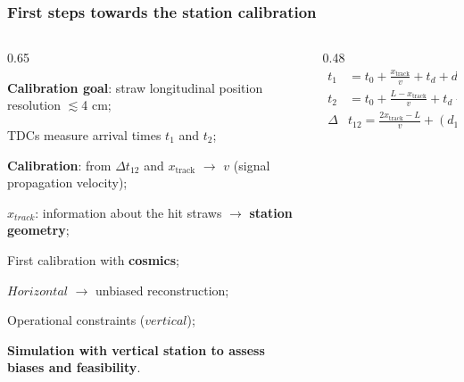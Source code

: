 \documentclass{beamer}
\begin{document}
\begin{frame}
    \frametitle{First steps towards the station calibration}
    
      \begin{columns}
        \begin{column}{0.65\framewidth}
                \setlength{\leftmargini}{1.2em}
                \vspace{-7mm}
            \begin{itemize}
             {\footnotesize 
             \item \textbf{Calibration goal}: straw longitudinal position resolution $\lesssim$4 cm;
           \vspace{3mm}
             \item TDCs measure arrival times $t_1$ and $t_2$;
  \vspace{3mm}
                \item \textbf{Calibration}: from $\Delta t_{12}$ and $x_{\text{track}}$ $\rightarrow$ $v$ (signal propagation velocity);
              \vspace{3mm}
                \item $x_{track}$: information about the hit straws $\rightarrow$ \textbf{station geometry};                          
              \vspace{3mm}
                \item First calibration with \textbf{cosmics};
                \vspace{3mm}
                \item $Horizontal$ $\rightarrow$ unbiased reconstruction; 
                               \vspace{3mm}
                \item Operational constraints ($vertical$);
                  \vspace{3mm}
                \item \textbf{Simulation with vertical station to assess biases and feasibility}.}  
            \end{itemize}
        \end{column}
        \begin{column}{0.48\framewidth}
            \begin{equation*}
\begin{aligned}
    t_1 &= t_0 + \frac{x_{\text{track}}}{v} + t_d + d_1 \\
    t_2 &= t_0 + \frac{L - x_{\text{track}}}{v} + t_d + d_2 \\
    \Delta & t_{12} = \frac{2x_{\text{track}}-L}{v} +(d_1-d_2)
\end{aligned}
\end{equation*}


\end{column}
\end{columns}
\end{frame}
\end{document}
